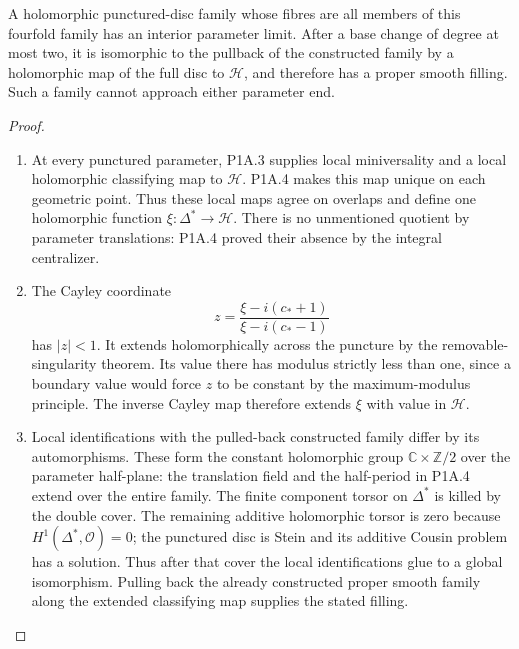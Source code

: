 \begin{theorem}\label{night:P1A.6}
A holomorphic punctured-disc family whose fibres are all
members of this fourfold family has an interior parameter
limit. After a base change of degree at most two, it is
isomorphic to the pullback of the constructed family by
a holomorphic map of the full disc to $\mathcal H$, and
therefore has a proper smooth filling. Such a family
cannot approach either parameter end.
\end{theorem}
\begin{proof}
\begin{enumerate}[label=\arabic*.]
\item At every punctured parameter, P1A.3 supplies local
miniversality and a local holomorphic classifying map to
$\mathcal H$. P1A.4 makes this map unique on each geometric
point. Thus these local maps agree on overlaps and define
one holomorphic function $\xi:\Delta^*\to\mathcal H$.
There is no unmentioned quotient by parameter translations:
P1A.4 proved their absence by the integral centralizer.

\item The Cayley coordinate
\[
 z=\frac{\xi-i(c_*+1)}{\xi-i(c_*-1)}
\]
has $|z|<1$. It extends holomorphically across the puncture
by the removable-singularity theorem. Its value there has
modulus strictly less than one, since a boundary value
would force $z$ to be constant by the maximum-modulus
principle. The inverse Cayley map therefore extends
$\xi$ with value in $\mathcal H$.

\item Local identifications with the pulled-back constructed
family differ by its automorphisms. These form the constant
holomorphic group $\mathbb C\times\mathbb Z/2$ over the
parameter half-plane: the translation field and the
half-period in P1A.4 extend over the entire family.
The finite component torsor on $\Delta^*$ is killed by
the double cover. The remaining additive holomorphic
torsor is zero because $H^1(\Delta^*,\mathcal O)=0$;
the punctured disc is Stein and its additive Cousin
problem has a solution. Thus after that cover the local
identifications glue to a global isomorphism. Pulling
back the already constructed proper smooth family along
the extended classifying map supplies the stated filling.

\end{enumerate}
\end{proof}


